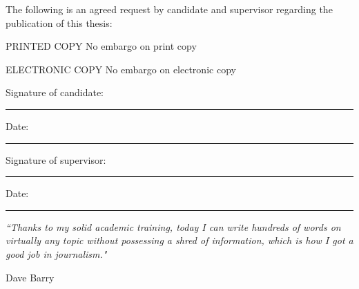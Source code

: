 \documentclass[11pt, oneside]{Thesis} %
\begin{document}
{The following is an agreed request by candidate and supervisor regarding the publication of this thesis:

PRINTED COPY
No embargo on print copy

ELECTRONIC COPY
No embargo on electronic copy

Signature of candidate:\\
\rule[1em]{25em}{0.5pt} %

 Date:\\
\rule[1em]{25em}{0.5pt} %

Signature of supervisor:\\
\rule[1em]{25em}{0.5pt} %

 Date:\\
\rule[1em]{25em}{0.5pt} %

}

\clearpage %


\pagestyle{empty} %

\null\vfill %

\textit{``Thanks to my solid academic training, today I can write hundreds of words on virtually any topic without possessing a shred of information, which is how I got a good job in journalism."}

\begin{flushright}
Dave Barry
\end{flushright}

\vfill\vfill\vfill\vfill\vfill\vfill\null %

\clearpage %



\end{document}
